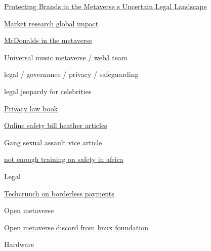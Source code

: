       \href{https://wwd.com/business-news/technology/metaverse-lawsuit-nike-stockx-hermes-metabirken-fashion-1235247763/}{Protecting
      Brands in the Metaverse s Uncertain Legal Landscape}
     
      \href{https://www.analysisgroup.com/globalassets/insights/publishing/2022-the-potential-global-economic-impact-of-the-metaverse.pdf}{Market
      research global impact}
     
      \href{https://www.businessinsider.com/mcdonalds-metaverse-virtual-online-restaurant-trademark-delivers-food-web3-nft-2022-2}{McDonalds
      in the metaverse}
     
      \href{https://www.musicweek.com/labels/read/universal-music-group-s-digital-strategy-team-creates-key-roles-for-web3-and-the-metaverse/087103}{Universal
      music metaverse / web3 team}
     
   
    legal / governance / privacy / safeguarding

     
    \tightlist
     
      legal jeopardy for celebrities
     
      \href{https://www.smashingmagazine.com/printed-books/understanding-privacy/\#bookTOC}{Privacy
      law book}
     
      \href{https://webdevlaw.uk/2022/11/21/a-quick-hypothetical-situation-or-your-crash-introduction-to-the-real-world/}{Online
      safety bill heather articles}
     
      \href{https://www.vice.com/en/article/3abpg3/woman-says-she-was-virtually-gang-raped-in-facebooks-metaverse?}{Gang
      sexual assault vice article}
     
      \href{https://www.thecable.ng/safeguarding-africans-safety-and-freedom-in-the-metaverse/amp}{not
      enough training on safety in africa}
     
   
    Legal

     
    \tightlist
     
      \href{https://techcrunch.com/2021/12/21/borderless-crypto-networks-wrestle-with-state-sanction-compliance/?}{Techcrunch
      on borderless payments}
     
   
    Open metaverse

     
    \tightlist
     
      \href{https://discord.gg/openmetaverse}{Open metaverse discord
      from linux foundation}
     
   
    Hardware

     
    \tightlist
     
